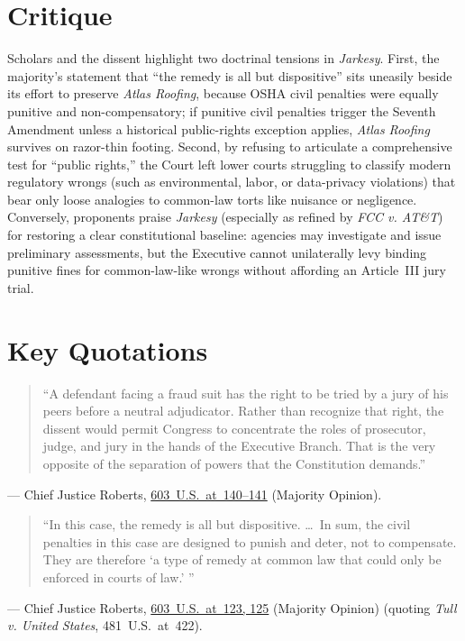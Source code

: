 \documentclass[12pt]{article}
\begin{document}
\section{Critique}
Scholars and the dissent highlight two doctrinal tensions in \textit{Jarkesy}. First, the majority's statement that ``the remedy is all but dispositive'' sits uneasily beside its effort to preserve \textit{Atlas Roofing}, because OSHA civil penalties were equally punitive and non-compensatory; if punitive civil penalties trigger the Seventh Amendment unless a historical public-rights exception applies, \textit{Atlas Roofing} survives on razor-thin footing. Second, by refusing to articulate a comprehensive test for ``public rights,'' the Court left lower courts struggling to classify modern regulatory wrongs (such as environmental, labor, or data-privacy violations) that bear only loose analogies to common-law torts like nuisance or negligence. Conversely, proponents praise \textit{Jarkesy} (especially as refined by \textit{FCC v. AT\&T}) for restoring a clear constitutional baseline: agencies may investigate and issue preliminary assessments, but the Executive cannot unilaterally levy binding punitive fines for common-law-like wrongs without affording an Article~III jury trial.

\section{Key Quotations}
\begin{quote}
``A defendant facing a fraud suit has the right to be tried by a jury of his peers before a neutral adjudicator. Rather than recognize that right, the dissent would permit Congress to concentrate the roles of prosecutor, judge, and jury in the hands of the Executive Branch. That is the very opposite of the separation of powers that the Constitution demands.''
\end{quote}
\noindent --- Chief Justice Roberts, \href{https://supreme.justia.com/cases/federal/us/603/22-859/}{603~U.S.~at~140--141} (Majority Opinion).

\begin{quote}
``In this case, the remedy is all but dispositive. \ldots\ In sum, the civil penalties in this case are designed to punish and deter, not to compensate. They are therefore `a type of remedy at common law that could only be enforced in courts of law.' ''
\end{quote}
\noindent --- Chief Justice Roberts, \href{https://supreme.justia.com/cases/federal/us/603/22-859/}{603~U.S.~at~123, 125} (Majority Opinion) (quoting \textit{Tull v. United States}, 481~U.S.~at~422).
\end{document}
